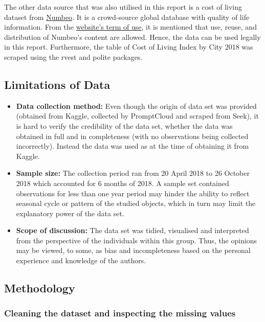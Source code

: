 \documentclass[11pt,a4paper,]{article}
\providecommand{\tightlist}{%
  \setlength{\itemsep}{0pt}\setlength{\parskip}{0pt}}
\begin{document}
The other data source that was also utilised in this report is a cost of living dataset from \href{https://www.numbeo.com/cost-of-living/rankings.jsp?title=2018}{Numbeo}. It is a crowd-source global database with quality of life information. From the \href{https://www.numbeo.com/common/terms_of_use.jsp}{website's term of use}, it is mentioned that use, reuse, and distribution of Numbeo's content are allowed. Hence, the data can be used legally in this report. Furthermore, the table of Cost of Living Index by City 2018 was scraped using the rvest and polite packages.

\hypertarget{limitations-of-data}{%
\subsection{Limitations of Data}\label{limitations-of-data}}

\begin{itemize}
\tightlist
\item
  \textbf{Data collection method:} Even though the origin of data set was provided (obtained from Kaggle, collected by PromptCloud and scraped from Seek), it is hard to verify the credibility of the data set, whether the data was obtained in full and in completeness (with no observations being collected incorrectly). Instead the data was used as at the time of obtaining it from Kaggle.
\item
  \textbf{Sample size:} The collection period ran from 20 April 2018 to 26 October 2018 which accounted for 6 months of 2018. A sample set contained observations for less than one year period may hinder the ability to reflect seasonal cycle or pattern of the studied objects, which in turn may limit the explanatory power of the data set.
\item
  \textbf{Scope of discussion:} The data set was tidied, visualised and interpreted from the perspective of the individuals within this group. Thus, the opinions may be viewed, to some, as bias and incompleteness based on the personal experience and knowledge of the authors.
\end{itemize}

\hypertarget{methodology}{%
\subsection{Methodology}\label{methodology}}

\hypertarget{cleaning-the-dataset-and-inspecting-the-missing-values}{%
\subsubsection{Cleaning the dataset and inspecting the missing values}\label{cleaning-the-dataset-and-inspecting-the-missing-values}}
\end{document}
